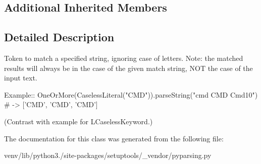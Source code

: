 \subsection*{Additional Inherited Members}


\subsection{Detailed Description}
\begin{DoxyVerb}Token to match a specified string, ignoring case of letters.
Note: the matched results will always be in the case of the given
match string, NOT the case of the input text.

Example::
    OneOrMore(CaselessLiteral("CMD")).parseString("cmd CMD Cmd10") # -> ['CMD', 'CMD', 'CMD']
    
(Contrast with example for L{CaselessKeyword}.)
\end{DoxyVerb}
 

The documentation for this class was generated from the following file\+:\begin{DoxyCompactItemize}
\item 
venv/lib/python3./site-\/packages/setuptools/\+\_\+vendor/pyparsing.\+py\end{DoxyCompactItemize}
